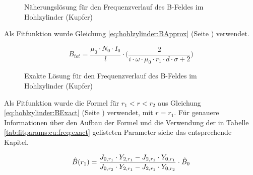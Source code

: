 \clearpage

\begin{figure}[h!]
    \resizebox{\textwidth}{!}{}
    \caption{N\"aherungsl\"osung f\"ur den Frequenzverlauf des B-Feldes im Hohlzylinder (Kupfer)}
    \label{fig:cu:freq:approx}
\end{figure}

\begin{minipage}[t][][t]{0.43\textwidth}
    
\end{minipage}
\begin{minipage}[t][][t]{0.56\textwidth}

    Als  Fitfunktion  wurde   Gleichung  \ref{eq:hohlzylinder:BApprox}  (Seite
    \pageref{eq:hohlzylinder:BApprox}) verwendet.

    \begin{equation*}
        B_{tot} = \frac{\mu_0 \cdot N_0 \cdot I_0}{l} \cdot \Biggl( \frac{2}{i \cdot \omega \cdot \mu_0 \cdot r_1 \cdot d \cdot \sigma + 2} \Biggr)
    \end{equation*}

\end{minipage}

\begin{figure}[h!]
    \resizebox{\textwidth}{!}{}
    \caption{Exakte L\"osung f\"ur den Frequenzverlauf des B-Feldes im Hohlzylinder (Kupfer)}
    \label{fig:cu:freq:exact}
\end{figure}

\begin{minipage}[t][][t]{0.43\textwidth}
    
\end{minipage}
\begin{minipage}[t][][t]{0.56\textwidth}

    Als  Fitfunktion   wurde  die  Formel  f\"ur   $r_1<r<r_2$  aus  Gleichung
    \ref{eq:hohlzylinder:BExact}    (Seite   \pageref{eq:hohlzylinder:BExact})
    verwendet,   mit   $r   =  r_1$. F\"ur   genauere   Informationen   \"uber
    den   Aufbau   der   Formel   und    die   Verwendung   der   in   Tabelle
    \ref{tab:fitparams:cu:freq:exact}    gelisteten   Parameter    siehe   das
    entsprechende Kapitel.

    \begin{equation*}
        \hat{B} (r_1) = \frac{J_{0,r_1} \cdot Y_{2,r_1} - J_{2,r_1} \cdot Y_{0,r_1}}{J_{0,r_2} \cdot Y_{2,r_1} - J_{2,r_1} \cdot Y_{0,r_2}} \cdot \hat{B}_0 \\
    \end{equation*}
\end{minipage}

